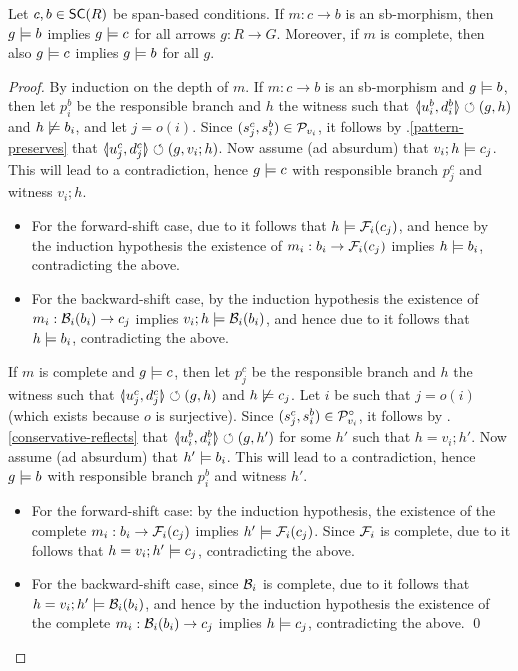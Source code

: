 \begin{proposition}
Let $c,b \in \SC{R}$ be span-based conditions. If $m:c\to b$ is an sb-morphism, then $g\models b$ implies $g \models c$ for all arrows $g:R\to G$. Moreover, if $m$ is complete, then also $g\models c$ implies $g\models b$ for all $g$.
\end{proposition}
%
\begin{fullorname}
\begin{proof}
By induction on the depth of $m$. If $m:c\to b$ is an sb-morphism and $g\models b$, then let $p^b_i$ be the responsible branch and $h$ the witness such that $\spanof{u^b_i}{d^b_i}\commutes (g,h)$ and $h\not\models b_i$, and let $j=o(i)$. Since $(s^c_j,s^b_i)\in \mathcal{P}_{v_i}$, it follows by .\ref{pattern-preserves} that $\spanof{u^c_j}{d^c_j}\commutes (g,v_i;h)$. Now assume (ad absurdum) that $v_i;h\models c_j$. This will lead to a contradiction, hence $g\models c$ with responsible branch $p^c_j$ and witness $v_i;h$.
\begin{itemize}[topsep=\smallskipamount]
\item For the forward-shift case, due to  it follows that $h\models \mathcal{F}_i(c_j)$, and hence by the induction hypothesis the existence of $m_i:b_i \rightarrow \mathcal{F}_i(c_j)$ implies $h\models b_i$, contradicting the above.

\item For the backward-shift case, by the induction hypothesis the existence of $m_i:\mathcal{B}_i(b_i)\rightarrow c_j$ implies $v_i;h\models \mathcal{B}_i(b_i)$, and hence due to  it follows that $h\models b_i$, contradicting the above.
\end{itemize}
If $m$ is complete and $g\models c$, then let $p^c_j$ be the responsible branch and $h$ the witness such that $\spanof{u^c_j}{d^c_j}\commutes (g,h)$ and $h\not\models c_j$. Let $i$ be such that $j=o(i)$ (which exists because $o$ is surjective). Since $(s^c_j,s^b_i)\in \mathcal{P}^\circ_{v_i}$, it follows by .\ref{conservative-reflects} that $\spanof{u^b_i}{d^b_i}\commutes (g,h')$ for some $h'$ such that $h=v_i;h'$. Now assume (ad absurdum) that $h'\models b_i$. This will lead to a contradiction, hence $g\models b$ with responsible branch $p^b_i$ and witness $h'$.
\begin{itemize}[topsep=\smallskipamount]
\item For the forward-shift case: by the induction hypothesis, the existence of the complete $m_i:b_i \rightarrow \mathcal{F}_i(c_j)$ implies $h'\models \mathcal{F}_i(c_j)$. Since $\mathcal{F}_i$ is complete, due to  it follows that $h=v_i;h'\models c_j$, contradicting the above.
\item For the backward-shift case, since $\mathcal{B}_i$ is complete, due to  it follows that $h=v_i;h'\models \mathcal{B}_i(b_i)$, and hence by the induction hypothesis the existence of the complete $m_i:\mathcal{B}_i(b_i)\rightarrow c_j$ implies $h\models c_j$, contradicting the above.
\qed
\end{itemize}
\end{proof}
\end{fullorname}

